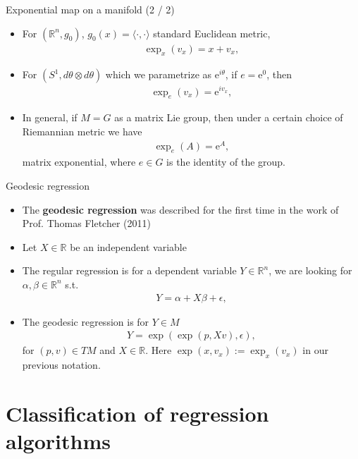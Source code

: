 \documentclass{beamer}
\begin{document}
\begin{frame}{Exponential map on a manifold (2 / 2)}
  \begin{itemize}
    \item For $(\mathbb{R}^n, g_0)$, $g_0(x) = \langle \cdot, \cdot \rangle$ standard Euclidean metric,
    \begin{align}
      \exp_x(v_x) = x + v_x,
    \end{align}
    \item For $(S^1, d\theta \otimes d\theta)$ which we parametrize as $\text{e}^{i \theta}$, if $e=\text{e}^{0}$, then 
    \begin{align}
      \exp_e(v_x) = \text{e}^{i v_x},
    \end{align}
    \item In general, if $M=G$ as a matrix Lie group, then under a certain choice of Riemannian metric we have 
    \begin{align}
      \exp_e(A) = \text{e}^A,
    \end{align}
    matrix exponential, where $e\in G$ is the identity of the group. 
  \end{itemize}
\end{frame}

\begin{frame}{Geodesic regression }
  \begin{itemize}
    \item The \textbf{geodesic regression} was described for the first time in the work of Prof. Thomas Fletcher (2011)
    \item Let $X \in \mathbb{R}$ be an independent variable
    \item The regular regression is for a dependent variable $Y \in \mathbb{R}^n$, we are looking for $\alpha, \beta \in \mathbb{R}^n$ s.t. 
    \begin{align}
      Y = \alpha + X \beta + \epsilon,
    \end{align}
    \item The geodesic regression is for $Y \in M$ 
    \begin{align}
      Y = \exp(\exp(p, Xv), \epsilon),
    \end{align}
    for $(p, v) \in TM$ and $X \in \mathbb{R}$. Here $\exp(x, v_x) := \exp_x(v_x)$ in our previous notation. 
  \end{itemize}
\end{frame}

\section{Classification of regression algorithms}
\end{document}
